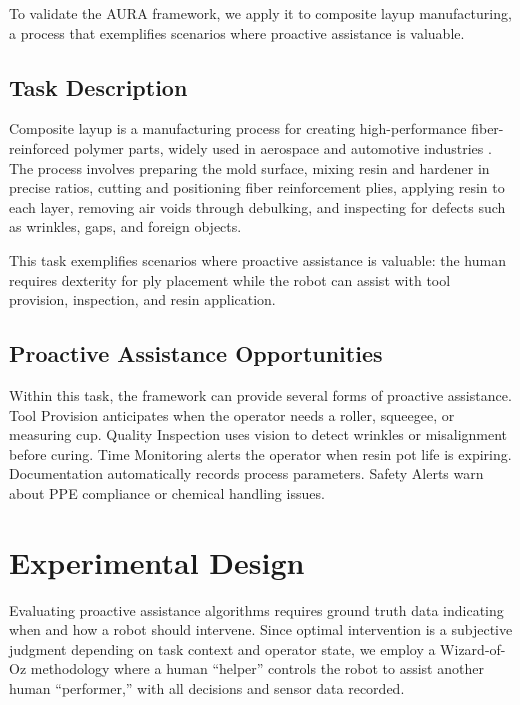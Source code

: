 To validate the AURA framework, we apply it to composite layup manufacturing, a process that exemplifies scenarios where proactive assistance is valuable.

\subsection{Task Description}

Composite layup is a manufacturing process for creating high-performance fiber-reinforced polymer parts, widely used in aerospace and automotive industries \citep{Makris2023, Manyar2023}. The process involves preparing the mold surface, mixing resin and hardener in precise ratios, cutting and positioning fiber reinforcement plies, applying resin to each layer, removing air voids through debulking, and inspecting for defects such as wrinkles, gaps, and foreign objects.

This task exemplifies scenarios where proactive assistance is valuable: the human requires dexterity for ply placement while the robot can assist with tool provision, inspection, and resin application.

\subsection{Proactive Assistance Opportunities}

Within this task, the framework can provide several forms of proactive assistance. Tool Provision anticipates when the operator needs a roller, squeegee, or measuring cup. Quality Inspection uses vision to detect wrinkles or misalignment before curing. Time Monitoring alerts the operator when resin pot life is expiring. Documentation automatically records process parameters. Safety Alerts warn about PPE compliance or chemical handling issues.

\section{Experimental Design}
\label{sec:experimental_design}

Evaluating proactive assistance algorithms requires ground truth data indicating when and how a robot should intervene. Since optimal intervention is a subjective judgment depending on task context and operator state, we employ a Wizard-of-Oz methodology where a human ``helper'' controls the robot to assist another human ``performer,'' with all decisions and sensor data recorded.

